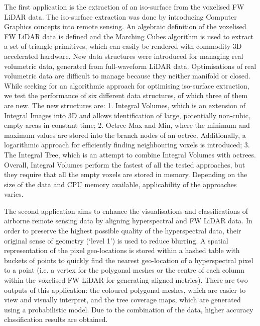 \documentclass{subfiles}
\begin{document}
\par The first application is the extraction of an iso-surface from the voxelised FW LiDAR data. The iso-surface extraction was done by introducing Computer Graphics concepts into remote sensing. An algebraic definition of the voxelised FW LiDAR data is defined and the Marching Cubes algorithm is used to extract a set of triangle primitives, which can easily be rendered with commodity 3D accelerated hardware. New data structures were introduced for managing real volumetric data, generated from full-waveform LiDAR data. Optimisations of real volumetric data are difficult to manage because they neither manifold or closed. While seeking for an algorithmic approach for optimising iso-surface extraction, we test the performance of six different data structures, of which three of them are new. The new structures are: 1. Integral Volumes, which is an extension of Integral Images into 3D and allows identification of large, potentially non-cubic, empty areas in constant time; 2. Octree Max and Min, where the minimum and maximum values are stored into the branch nodes of an octree. Additionally, a logarithmic approach for efficiently finding neighbouring voxels is introduced; 3. The Integral Tree, which is an attempt to combine Integral Volumes with octrees. Overall, Integral Volumes perform the fastest of all the tested approaches, but they require that all the empty voxels are stored in memory. Depending on the size of the data and CPU memory available, applicability of the approaches varies.

\par The second application aims to enhance the visualisations and classifications of airborne remote sensing data by aligning hyperspectral and FW LiDAR data.  In order to preserve the highest possible quality of the hyperspectral data, their original sense of geometry (`level 1') is used to reduce blurring. A spatial representation of the pixel geo-locations is stored within a hashed table with buckets of points to quickly find the nearest geo-location of a hyperspectral pixel to a point (i.e. a vertex for the polygonal meshes or the centre of each column within the voxelised FW LiDAR for generating aligned metrics). There are two outputs of this application: the coloured polygonal meshes, which are easier to view and visually interpret, and the tree coverage maps, which are generated using a probabilistic model.  Due to the combination of the data, higher accuracy classification results are obtained.
\end{document}
